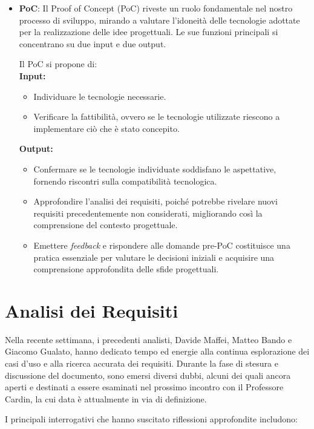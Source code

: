 \begin{itemize}
	\item 	\textbf{PoC}:		
			Il Proof of Concept (PoC) riveste un ruolo fondamentale nel nostro processo di sviluppo, 
			mirando a valutare l'idoneità delle tecnologie adottate per la realizzazione delle idee progettuali. 
			Le sue funzioni principali si concentrano su due input e due output.

			Il PoC si propone di: \\
			\textbf{Input:}
			\begin{itemize}
				\item Individuare le tecnologie necessarie.
				\item Verificare la fattibilità, ovvero se le tecnologie utilizzate riescono a implementare ciò che è stato concepito.
			\end{itemize}
			
			\textbf{Output:}
			\begin{itemize}
				\item Confermare se le tecnologie individuate soddisfano le aspettative, fornendo riscontri sulla compatibilità tecnologica.
				\item Approfondire l'analisi dei requisiti, poiché potrebbe rivelare nuovi requisiti precedentemente non considerati, 
					migliorando così la comprensione del contesto progettuale.
				\item Emettere \textit{feedback} e rispondere alle domande pre-PoC costituisce una pratica essenziale per valutare le decisioni 
					iniziali e acquisire una comprensione approfondita delle sfide progettuali.
			\end{itemize}
\end{itemize}	

\section{Analisi dei Requisiti}

Nella recente settimana, i precedenti analisti, Davide Maffei, Matteo Bando e Giacomo Gualato, 
hanno dedicato tempo ed energie alla continua esplorazione dei casi d'uso e alla ricerca accurata dei requisiti. 
Durante la fase di stesura e discussione del documento, sono emersi diversi dubbi, 
alcuni dei quali ancora aperti e destinati a essere esaminati nel prossimo incontro con il Professore Cardin, 
la cui data è attualmente in via di definizione.

I principali interrogativi che hanno suscitato riflessioni approfondite includono:

